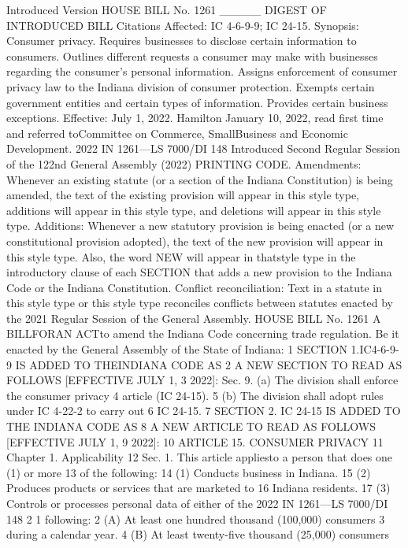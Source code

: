 Introduced Version
HOUSE BILL No. 1261
_____
DIGEST OF INTRODUCED BILL
Citations Affected: IC 4-6-9-9; IC 24-15.
Synopsis: Consumer privacy. Requires businesses to disclose certain
information to consumers. Outlines different requests a consumer may
make with businesses regarding the consumer's personal information.
Assigns enforcement of consumer privacy law to the Indiana division
of consumer protection. Exempts certain government entities and
certain types of information. Provides certain business exceptions.
Effective: July 1, 2022.
Hamilton
January 10, 2022, read first time and referred toCommittee on Commerce, SmallBusiness
and Economic Development.
2022 IN 1261—LS 7000/DI 148
Introduced
Second Regular Session of the 122nd General Assembly (2022)
PRINTING CODE. Amendments: Whenever an existing statute (or a section of the Indiana
Constitution) is being amended, the text of the existing provision will appear in this style type,
additions will appear in this style type, and deletions will appear in this style type.
Additions: Whenever a new statutory provision is being enacted (or a new constitutional
provision adopted), the text of the new provision will appear in this style type. Also, the
word NEW will appear in thatstyle type in the introductory clause of each SECTION that adds
a new provision to the Indiana Code or the Indiana Constitution.
Conflict reconciliation: Text in a statute in this style type or this style type reconciles conflicts
between statutes enacted by the 2021 Regular Session of the General Assembly.
HOUSE BILL No. 1261
A BILLFORAN ACTto amend the Indiana Code concerning trade
regulation.
Be it enacted by the General Assembly of the State of Indiana:
1 SECTION 1.IC4-6-9-9 IS ADDED TO THEINDIANA CODE AS
2 A NEW SECTION TO READ AS FOLLOWS [EFFECTIVE JULY 1,
3 2022]: Sec. 9. (a) The division shall enforce the consumer privacy
4 article (IC 24-15).
5 (b) The division shall adopt rules under IC 4-22-2 to carry out
6 IC 24-15.
7 SECTION 2. IC 24-15 IS ADDED TO THE INDIANA CODE AS
8 A NEW ARTICLE TO READ AS FOLLOWS [EFFECTIVE JULY 1,
9 2022]:
10 ARTICLE 15. CONSUMER PRIVACY
11 Chapter 1. Applicability
12 Sec. 1. This article appliesto a person that does one (1) or more
13 of the following:
14 (1) Conducts business in Indiana.
15 (2) Produces products or services that are marketed to
16 Indiana residents.
17 (3) Controls or processes personal data of either of the
2022 IN 1261—LS 7000/DI 148
2
1 following:
2 (A) At least one hundred thousand (100,000) consumers
3 during a calendar year.
4 (B) At least twenty-five thousand (25,000) consumers
